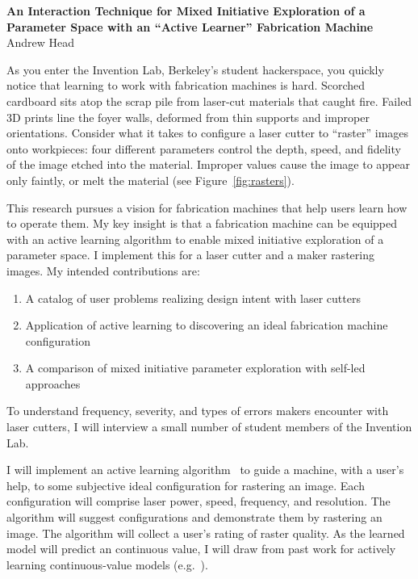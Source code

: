 \documentclass[12pt]{article}
\begin{document}

\begin{center}
  \textbf{An Interaction Technique for Mixed Initiative Exploration of a\\
    Parameter Space with an ``Active Learner'' Fabrication Machine}\\
  \vspace{.5em}
  Andrew Head
\end{center}

As you enter the Invention Lab, Berkeley's student hackerspace, you quickly notice that learning to work with fabrication machines is hard.
Scorched cardboard sits atop the scrap pile from laser-cut materials that caught fire.
Failed 3D prints line the foyer walls, deformed from thin supports and improper orientations.
Consider what it takes to configure a laser cutter to ``raster'' images onto workpieces:
four different parameters control the depth, speed, and fidelity of the image etched into the material.
Improper values cause the image to appear only faintly, or melt the material (see Figure~\ref{fig:rasters}).

This research pursues a vision for fabrication machines that help users learn how to operate them.
My key insight is that a fabrication machine can be equipped with an active learning algorithm to enable mixed initiative exploration of a parameter space.
I implement this for a laser cutter and a maker rastering images.
My intended contributions are:
\begin{enumerate}[noitemsep]
\item A catalog of user problems realizing design intent with laser cutters
\item Application of active learning to discovering an ideal fabrication machine configuration
\item A comparison of mixed initiative parameter exploration with self-led approaches
\end{enumerate}

To understand frequency, severity, and types of errors makers encounter with laser cutters, I will interview a small number of student members of the Invention Lab.

I will implement an active learning algorithm~\cite{settles_active_2010} to guide a machine, with a user's help, to some subjective ideal configuration for rastering an image.
Each configuration will comprise laser power, speed, frequency, and resolution.
The algorithm will suggest configurations and demonstrate them by rastering an image.
The algorithm will collect a user's rating of raster quality.
As the learned model will predict an continuous value, I will draw from past work for actively learning continuous-value models (e.g.~\cite{sugiyama_active_2008}).
\end{document}
